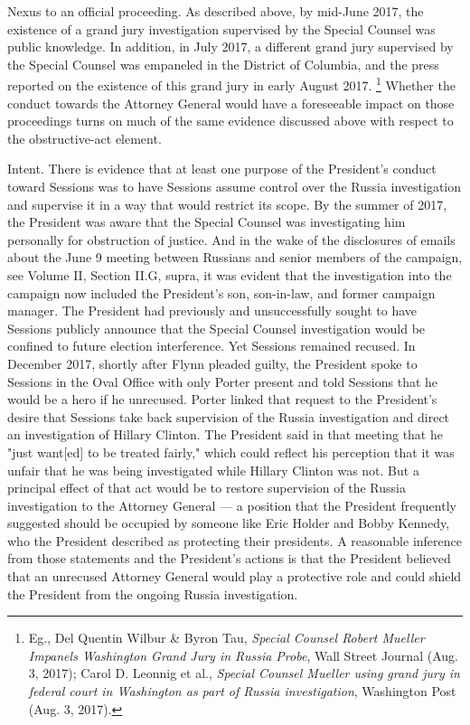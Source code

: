 Nexus to an official proceeding.
As described above, by mid-June 2017, the existence of a grand jury investigation supervised by the Special Counsel was public knowledge.
In addition, in July 2017, a different grand jury supervised by the Special Counsel was empaneled in the District of Columbia, and the press reported on the existence of this grand jury in early August 2017.%
\footnote{Eg., Del Quentin Wilbur \& Byron Tau, \textit{Special Counsel Robert Mueller Impanels Washington Grand Jury in Russia Probe}, Wall Street Journal (Aug. 3, 2017);
Carol D. Leonnig et al., \textit{Special Counsel Mueller using grand jury in federal court in Washington as part of Russia investigation}, Washington Post (Aug. 3, 2017).}
Whether the conduct towards the Attorney General would have a foreseeable impact on those proceedings turns on much of the same evidence discussed above with respect to the obstructive-act element.

Intent.
There is evidence that at least one purpose of the President's conduct toward Sessions was to have Sessions assume control over the Russia investigation and supervise it in a way that would restrict its scope.
By the summer of 2017, the President was aware that the Special Counsel was investigating him personally for obstruction of justice.
And in the wake of the disclosures of emails about the June 9 meeting between Russians and senior members of the campaign, see Volume II, Section II.G, supra, it was evident that the investigation into the campaign now included the President's son, son-in-law, and former campaign manager.
The President had previously and unsuccessfully sought to have Sessions publicly announce that the Special Counsel investigation would be confined to future election interference.
Yet Sessions remained recused.
In December 2017, shortly after Flynn pleaded guilty, the President spoke to Sessions in the Oval Office with only Porter present and told Sessions that he would be a hero if he unrecused.
Porter linked that request to the President's desire that Sessions take back supervision of the Russia investigation and direct an investigation of Hillary Clinton.
The President said in that meeting that he "just want[ed] to be treated fairly," which could reflect his perception that it was unfair that he was being investigated while Hillary Clinton was not.
But a principal effect of that act would be to restore supervision of the Russia investigation to the
Attorney General — a position that the President frequently suggested should be occupied by someone like Eric Holder and Bobby Kennedy, who the President described as protecting their presidents.
A reasonable inference from those statements and the President's actions is that the President believed that an unrecused Attorney General would play a protective role and could shield the President from the ongoing Russia investigation.

